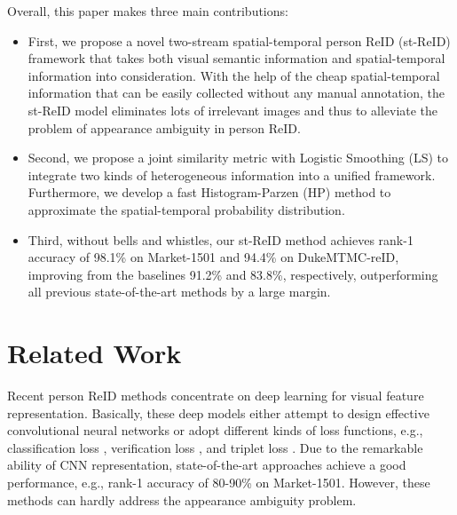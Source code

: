 \documentclass[letterpaper]{article} \usepackage{aaai19}  \usepackage{times}  \usepackage{helvet}  \usepackage{courier}  \usepackage{url}  \usepackage{graphicx}  \usepackage{subfig}
\begin{document}
Overall, this paper makes three main contributions:
\begin{itemize}
  \item First, we propose a novel two-stream spatial-temporal person ReID (st-ReID) framework that takes both visual semantic information and spatial-temporal information into consideration. With the help of the cheap spatial-temporal information that can be easily collected without any manual annotation, the st-ReID model eliminates lots of irrelevant images and thus to alleviate the problem of appearance ambiguity in person ReID.

  \item Second, we propose a joint similarity metric with Logistic Smoothing (LS) to integrate two kinds of heterogeneous information into a unified framework. Furthermore, we develop a fast Histogram-Parzen (HP) method to approximate the spatial-temporal probability distribution.

  \item Third, without bells and whistles, our st-ReID method achieves rank-1 accuracy of 98.1\% on Market-1501 and 94.4\% on DukeMTMC-reID, improving from the baselines 91.2\% and 83.8\%, respectively, outperforming all previous state-of-the-art methods by a large margin.
\end{itemize}


\section{Related Work}
Recent person ReID methods concentrate on deep learning for visual feature representation. Basically, these deep models either attempt to design effective convolutional neural networks or adopt different kinds of loss functions, e.g., classification loss \cite{zheng2016mars,feng2018learning,Liang2018}, verification loss \cite{li2014deepreid,chen2015deep}, and triplet loss \cite{ding2015deep,wang2017tcsvt,HermansBL17,Wang2016DARI}. Due to the remarkable ability of CNN representation, state-of-the-art approaches achieve a good performance, e.g., rank-1 accuracy of 80-90\% on Market-1501. However, these methods can hardly address the appearance ambiguity problem.
\end{document}
